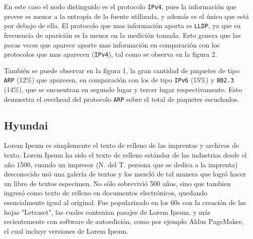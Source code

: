 \documentclass[final,narroweqnarray,inline]{ieee}
\begin{document}
    En este caso el nodo distinguido es el protocolo \texttt{IPv4}, 
    pues la información que provee es menor a la entropía de la fuente 
    utilizada, y además es el único que está por debajo de ella. El
    protocolo que mas información aporta es \texttt{LLDP}, ya que
    su frecuencia de aparición es la menor en la medición tomada. Esto
    genera que las pocas veces que aparece aporte mas información en 
    comparación con los protocolos que mas aparecen (\texttt{IPv4}),
    tal como se observa en la figura 2.

    También se puede observar en la figura 1, la gran cantidad de paquetes 
    de tipo \texttt{ARP} (12\%) que aparecen, en comparación con los
    de tipo \texttt{IPv6} (15\%) y \texttt{802.3} (14\%), que se encuentran
    en segundo lugar y tercer lugar respectivamente. Esto demuestra el overhead
    del protocolo \texttt{ARP} sobre el total de paquetes escuchados.

  \subsection{Hyundai}

Lorem Ipsum es simplemente el texto de relleno de las imprentas y archivos de texto. Lorem Ipsum ha sido el texto de relleno estándar de las industrias desde el año 1500, cuando un impresor (N. del T. persona que se dedica a la imprenta) desconocido usó una galería de textos y los mezcló de tal manera que logró hacer un libro de textos especimen. No sólo sobrevivió 500 años, sino que tambien ingresó como texto de relleno en documentos electrónicos, quedando esencialmente igual al original. Fue popularizado en los 60s con la creación de las hojas "Letraset", las cuales contenian pasajes de Lorem Ipsum, y más recientemente con software de autoedición, como por ejemplo Aldus PageMaker, el cual incluye versiones de Lorem Ipsum.
\end{document}
